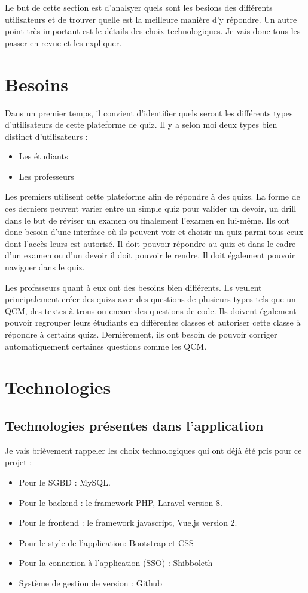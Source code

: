 Le but de cette section est d'analsyer quels sont les besions des différents utilisateurs et de trouver quelle est la meilleure manière d'y répondre. Un autre point très important est le détails des choix technologiques. Je vais donc tous les passer en revue et les expliquer.
\section{Besoins}

Dans un premier temps, il convient d'identifier quels seront les différents types d'utilisateurs de cette plateforme de quiz. Il y a selon moi deux types bien distinct d'utilisateurs :
\begin{itemize}
    \item Les étudiants
    \item Les professeurs
\end{itemize}

Les premiers utilisent cette plateforme afin de répondre à des quizs. La forme de ces derniers peuvent varier entre un simple quiz pour valider un devoir, un drill dans le but de réviser un examen ou finalement l'examen en lui-même. Ils ont donc besoin d'une interface où ils peuvent voir et choisir un quiz parmi tous ceux dont l'accès leurs est autorisé. Il doit pouvoir répondre au quiz et dans le cadre d'un examen ou d'un devoir il doit pouvoir le rendre. Il doit également pouvoir naviguer dans le quiz.

Les professeurs quant à eux ont des besoins bien différents. Ils veulent principalement créer des quizs avec des questions de plusieurs types tels que un QCM, des textes à trous ou encore des questions de code. Ils doivent également pouvoir regrouper leurs étudiants en différentes classes et autoriser cette classe à répondre à certains quizs. Dernièrement, ils ont besoin de pouvoir corriger automatiquement certaines questions comme les QCM.




\section{Technologies}
\subsection{Technologies présentes dans l'application}
Je vais brièvement rappeler les choix technologiques qui ont déjà été pris pour ce projet :
\begin{itemize}
    \item Pour le SGBD : MySQL.
    \item Pour le backend : le framework PHP, Laravel version 8.
    \item Pour le frontend : le framework javascript, Vue.js version 2.
    \item Pour le style de l'application: Bootstrap et CSS
    \item Pour la connexion à l'application (SSO) : Shibboleth
    \item Système de gestion de version : Github
\end{itemize}

